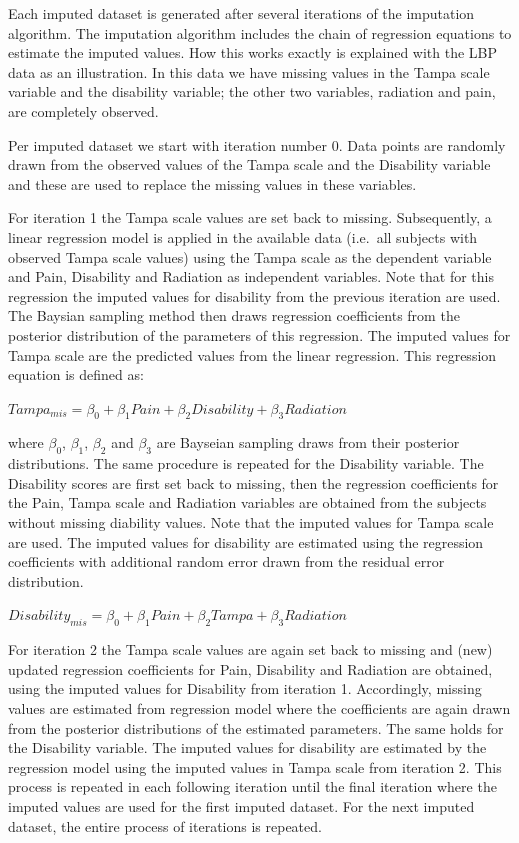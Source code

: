 \documentclass[]{book}
\begin{document}
Each imputed dataset is generated after several iterations of the
imputation algorithm. The imputation algorithm includes the chain of
regression equations to estimate the imputed values. How this works
exactly is explained with the LBP data as an illustration. In this data
we have missing values in the Tampa scale variable and the disability
variable; the other two variables, radiation and pain, are completely
observed.

Per imputed dataset we start with iteration number 0. Data points are
randomly drawn from the observed values of the Tampa scale and the
Disability variable and these are used to replace the missing values in
these variables.

For iteration 1 the Tampa scale values are set back to missing.
Subsequently, a linear regression model is applied in the available data
(i.e.~all subjects with observed Tampa scale values) using the Tampa
scale as the dependent variable and Pain, Disability and Radiation as
independent variables. Note that for this regression the imputed values
for disability from the previous iteration are used. The Baysian
sampling method then draws regression coefficients from the posterior
distribution of the parameters of this regression. The imputed values
for Tampa scale are the predicted values from the linear regression.
This regression equation is defined as:

\(Tampa_{mis} = \beta_0 + \beta_1Pain + \beta_2Disability + \beta_3Radiation\)

where \(\beta_0\), \(\beta_1\), \(\beta_2\) and \(\beta_3\) are Bayseian
sampling draws from their posterior distributions. The same procedure is
repeated for the Disability variable. The Disability scores are first
set back to missing, then the regression coefficients for the Pain,
Tampa scale and Radiation variables are obtained from the subjects
without missing diability values. Note that the imputed values for Tampa
scale are used. The imputed values for disability are estimated using
the regression coefficients with additional random error drawn from the
residual error distribution.

\(Disability_{mis} = \beta_0 + \beta_1Pain + \beta_2Tampa + \beta_3Radiation\)

For iteration 2 the Tampa scale values are again set back to missing and
(new) updated regression coefficients for Pain, Disability and Radiation
are obtained, using the imputed values for Disability from iteration 1.
Accordingly, missing values are estimated from regression model where
the coefficients are again drawn from the posterior distributions of the
estimated parameters. The same holds for the Disability variable. The
imputed values for disability are estimated by the regression model
using the imputed values in Tampa scale from iteration 2. This process
is repeated in each following iteration until the final iteration where
the imputed values are used for the first imputed dataset. For the next
imputed dataset, the entire process of iterations is repeated.
\end{document}
